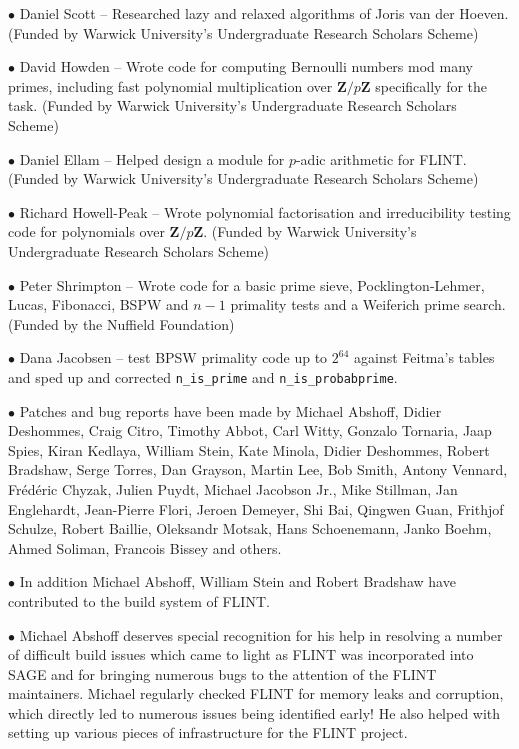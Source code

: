 \documentclass[a4paper,10pt]{book}
\newcommand{\Z}{\mathbf{Z}}%
\newcommand{\code}{\lstinline}
\begin{document}
$\bullet$ Daniel Scott -- Researched lazy and relaxed algorithms of Joris van
der Hoeven. (Funded by Warwick University's Undergraduate Research Scholars
Scheme)

$\bullet$ David Howden -- Wrote code for computing Bernoulli numbers mod many
primes, including fast polynomial multiplication over $\Z/p\Z$ specifically for
the task. (Funded by Warwick University's Undergraduate Research Scholars
Scheme)

$\bullet$ Daniel Ellam -- Helped design a module for $p$-adic arithmetic for
FLINT. (Funded by Warwick University's Undergraduate Research Scholars Scheme)

$\bullet$ Richard Howell-Peak -- Wrote polynomial factorisation and
irreducibility testing code for polynomials over $\Z/p\Z$. (Funded by Warwick
University's Undergraduate Research Scholars Scheme)

$\bullet$ Peter Shrimpton -- Wrote code for a basic prime sieve,
Pocklington-Lehmer, Lucas, Fibonacci, BSPW and $n-1$ primality tests and a
Weiferich prime search. (Funded by the Nuffield Foundation)

$\bullet$ Dana Jacobsen -- test BPSW primality code up to $2^64$ against 
Feitma's tables and sped up and corrected \code{n_is_prime} and 
\code{n_is_probabprime}.

$\bullet$ Patches and bug reports have been made by Michael Abshoff,
Didier Deshommes, Craig Citro, Timothy Abbot, Carl Witty, Gonzalo Tornaria,
Jaap Spies, Kiran Kedlaya, William Stein, Kate Minola, Didier Deshommes, Robert
Bradshaw, Serge Torres, Dan Grayson, Martin Lee, Bob Smith, Antony Vennard,
Fr\'{e}d\'{e}ric Chyzak, Julien Puydt, Michael Jacobson Jr.,
Mike Stillman, Jan Englehardt, Jean-Pierre Flori, Jeroen Demeyer, Shi Bai,
Qingwen Guan, Frithjof Schulze, Robert Baillie, Oleksandr Motsak, Hans
Schoenemann, Janko Boehm, Ahmed Soliman, Francois Bissey and others.

$\bullet$ In addition Michael Abshoff, William Stein and Robert Bradshaw have
contributed to the build system of FLINT.

$\bullet$ Michael Abshoff deserves special recognition for his help in
resolving a number of difficult build issues which came to light as FLINT was
incorporated into SAGE and for bringing numerous bugs to the attention of the
FLINT maintainers. Michael regularly checked FLINT for memory leaks and
corruption, which directly led to numerous issues being identified early!
He also helped with setting up various pieces of infrastructure for the FLINT
project.
\end{document}
